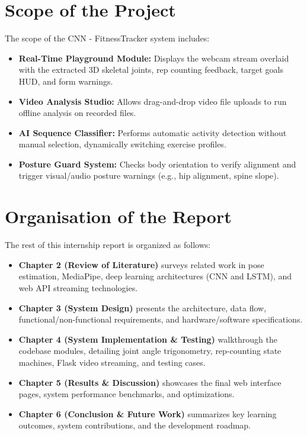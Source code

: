 \section{Scope of the Project}
The scope of the CNN - FitnessTracker system includes:
\begin{itemize}
    \item \textbf{Real-Time Playground Module:} Displays the webcam stream overlaid with the extracted 3D skeletal joints, rep counting feedback, target goals HUD, and form warnings.
    \item \textbf{Video Analysis Studio:} Allows drag-and-drop video file uploads to run offline analysis on recorded files.
    \item \textbf{AI Sequence Classifier:} Performs automatic activity detection without manual selection, dynamically switching exercise profiles.
    \item \textbf{Posture Guard System:} Checks body orientation to verify alignment and trigger visual/audio posture warnings (e.g., hip alignment, spine slope).
\end{itemize}

\section{Organisation of the Report}
The rest of this internship report is organized as follows:
\begin{itemize}
    \item \textbf{Chapter 2 (Review of Literature)} surveys related work in pose estimation, MediaPipe, deep learning architectures (CNN and LSTM), and web API streaming technologies.
    \item \textbf{Chapter 3 (System Design)} presents the architecture, data flow, functional/non-functional requirements, and hardware/software specifications.
    \item \textbf{Chapter 4 (System Implementation \& Testing)} walkthrough the codebase modules, detailing joint angle trigonometry, rep-counting state machines, Flask video streaming, and testing cases.
    \item \textbf{Chapter 5 (Results \& Discussion)} showcases the final web interface pages, system performance benchmarks, and optimizations.
    \item \textbf{Chapter 6 (Conclusion \& Future Work)} summarizes key learning outcomes, system contributions, and the development roadmap.
\end{itemize}
